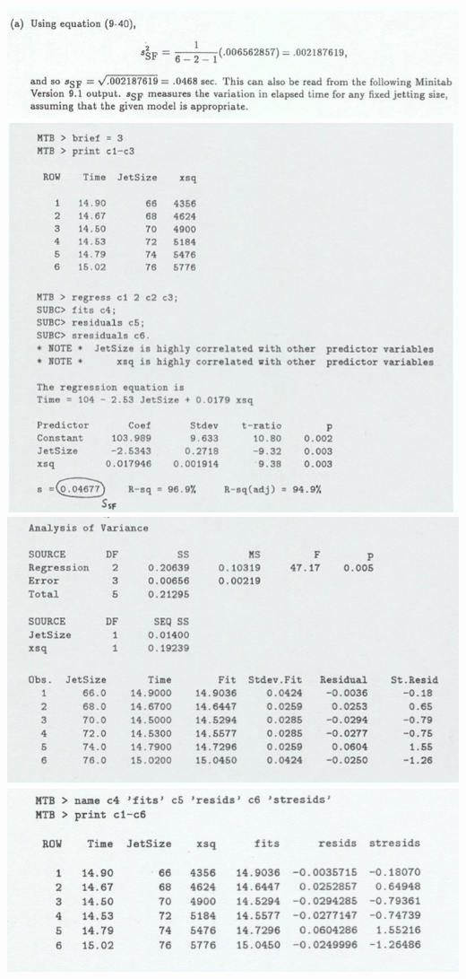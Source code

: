 \documentclass{article}\usepackage{graphicx, color}
\numberwithin{equation}{section}
\begin{document}
\begin{flushleft}
\begin{enumerate}[1. ]
 \includegraphics{../../fig/h11p3sol1.png}
 \includegraphics{../../fig/h11p3sol2.png}
 \includegraphics{../../fig/h11p3sol3.png}
 \includegraphics{../../fig/h11p3sol4.png}

\end{enumerate}
\end{flushleft}
\end{document}
